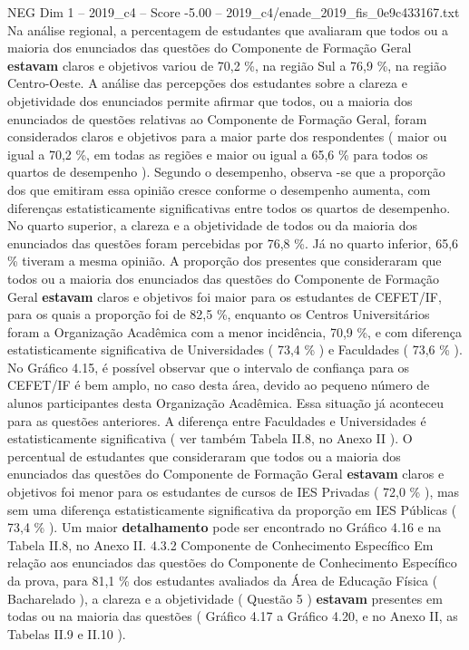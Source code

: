 \begin{textsample}{NEG Dim 1 – 2019\_c4 – Score -5.00 – 2019\_c4/enade\_2019\_fis\_0e9c433167.txt}
Na análise regional, a percentagem de estudantes que avaliaram que todos ou a maioria dos enunciados das questões do Componente de Formação Geral \textbf{estavam} claros e objetivos variou de 70,2 \%, na região Sul a 76,9 \%, na região Centro-Oeste.
A análise das percepções dos estudantes sobre a clareza e objetividade dos enunciados permite afirmar que todos, ou a maioria dos enunciados de questões relativas ao Componente de Formação Geral, foram considerados claros e objetivos para a maior parte dos respondentes ( maior ou igual a 70,2 \%, em todas as regiões e maior ou igual a 65,6 \% para todos os quartos de desempenho ).
Segundo o desempenho, observa -se que a proporção dos que emitiram essa opinião cresce conforme o desempenho aumenta, com diferenças estatisticamente significativas entre todos os quartos de desempenho.
No quarto superior, a clareza e a objetividade de todos ou da maioria dos enunciados das questões foram percebidas por 76,8 \%.
Já no quarto inferior, 65,6 \% tiveram a mesma opinião.
A proporção dos presentes que consideraram que todos ou a maioria dos enunciados das questões do Componente de Formação Geral \textbf{estavam} claros e objetivos foi maior para os estudantes de CEFET/IF, para os quais a proporção foi de 82,5 \%, enquanto os Centros Universitários foram a Organização Acadêmica com a menor incidência, 70,9 \%, e com diferença estatisticamente significativa de Universidades ( 73,4 \% ) e Faculdades ( 73,6 \% ).
No Gráfico 4.15, é possível observar que o intervalo de confiança para os CEFET/IF é bem amplo, no caso desta área, devido ao pequeno número de alunos participantes desta Organização Acadêmica.
Essa situação já aconteceu para as questões anteriores.
A diferença entre Faculdades e Universidades é estatisticamente significativa ( ver também Tabela II.8, no Anexo II ).
O percentual de estudantes que consideraram que todos ou a maioria dos enunciados das questões do Componente de Formação Geral \textbf{estavam} claros e objetivos foi menor para os estudantes de cursos de IES Privadas ( 72,0 \% ), mas sem uma diferença estatisticamente significativa da proporção em IES Públicas ( 73,4 \% ).
Um maior \textbf{detalhamento} pode ser encontrado no Gráfico 4.16 e na Tabela II.8, no Anexo II. 4.3.2 Componente de Conhecimento Específico Em relação aos enunciados das questões do Componente de Conhecimento Específico da prova, para 81,1 \% dos estudantes avaliados da Área de Educação Física ( Bacharelado ), a clareza e a objetividade ( Questão 5 ) \textbf{estavam} presentes em todas ou na maioria das questões ( Gráfico 4.17 a Gráfico 4.20, e no Anexo II, as Tabelas II.9 e II.10 ).

\end{textsample}
